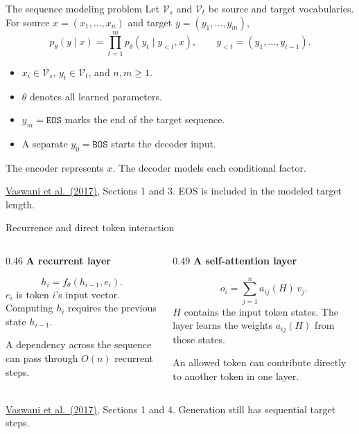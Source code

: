 \documentclass[aspectratio=169,11pt]{beamer}
\newcommand{\lead}[1]{{\color{ink}\bfseries #1}\par\vspace{1.2mm}}
\newcommand{\src}[1]{\par\vfill{\fontsize{7}{8.5}\selectfont\color{muted}#1}\par}
\newcommand{\paper}{\href{https://arxiv.org/abs/1706.03762}{Vaswani et al.\ (2017)}}
\begin{document}
\begin{frame}[t]{The sequence modeling problem}
Let $\mathcal V_s$ and $\mathcal V_t$ be source and target vocabularies.
For source $x=(x_1,\ldots,x_n)$ and target $y=(y_1,\ldots,y_m)$,
\[
  p_\theta(y\mid x)=\prod_{t=1}^{m}p_\theta(y_t\mid y_{<t},x),
  \qquad y_{<t}=(y_1,\ldots,y_{t-1}).
\]
\begin{itemize}
  \item $x_i\in\mathcal V_s$, $y_t\in\mathcal V_t$, and $n,m\geq1$.
  \item $\theta$ denotes all learned parameters.
  \item $y_m=\texttt{EOS}$ marks the end of the target sequence.
  \item A separate $y_0=\texttt{BOS}$ starts the decoder input.
\end{itemize}
The encoder represents $x$. The decoder models each conditional factor.
\src{\paper, Sections 1 and 3. EOS is included in the modeled target length.}
\end{frame}

\begin{frame}[t]{Recurrence and direct token interaction}
\begin{columns}[T,onlytextwidth]
\begin{column}{0.46\textwidth}
  \lead{A recurrent layer}
  \[h_i=f_\theta(h_{i-1},e_i).\]
  $e_i$ is token $i$'s input vector. Computing $h_i$ requires the previous
  state $h_{i-1}$.
  \par\vspace{2mm}
  A dependency across the sequence can pass through $O(n)$ recurrent steps.
\end{column}
\begin{column}{0.49\textwidth}
  \lead{A self-attention layer}
  \[o_i=\sum_{j=1}^{n}a_{ij}(H)\,v_j.\]
  $H$ contains the input token states. The layer learns the weights
  $a_{ij}(H)$ from those states.
  \par\vspace{2mm}
  An allowed token can contribute directly to another token in one layer.
\end{column}
\end{columns}
\src{\paper, Sections 1 and 4. Generation still has sequential target steps.}
\end{frame}
\end{document}
